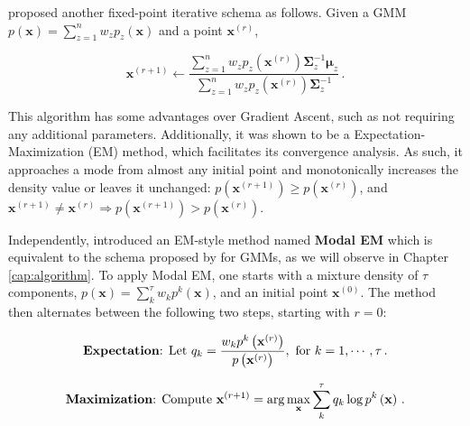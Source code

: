 \citet{Carreira-Perpinan2000} proposed another fixed-point iterative schema as follows. Given a GMM $p(\mathbf{x}) = \sum_{z=1}^n w_z p_z(\mathbf{x})$ and a point $\mathbf{x}^{(r)}$,

\begin{equation}
  \label{eq:mem:gmm}
  \mathbf{x}^{(r+1)} \gets \frac{
  \sum_{z=1}^n w_z p_z\left(\mathbf{x}^{(r)}\right) \boldsymbol{\Sigma}_z^{-1} \boldsymbol{\mu}_z
  }{
  \sum_{z=1}^n w_z p_z\left(\mathbf{x}^{(r)}\right) \boldsymbol{\Sigma}_z^{-1}
  } \, .
\end{equation}

\noindent This algorithm has some advantages over Gradient Ascent, such as not requiring any additional parameters. Additionally, it was shown to be a Expectation-Maximization (EM) method, which facilitates its convergence analysis. As such, it approaches a mode from almost any initial point and monotonically increases the density value or leaves it unchanged: $p(\mathbf{x}^{(r+1)}) \geq p(\mathbf{x}^{(r)})$, and $\mathbf{x}^{(r+1)} \neq \mathbf{x}^{(r)} \Rightarrow p(\mathbf{x}^{(r+1)}) > p(\mathbf{x}^{(r)})$.

Independently, \citet{Li2007} introduced an EM-style method named \textbf{Modal EM} which is equivalent to the schema proposed by \citet{Carreira-Perpinan2000} for GMMs, as we will observe in Chapter \ref{cap:algorithm}. To apply Modal EM, one starts with a mixture density of $\tau$ components, $p(\mathbf{x}) = \sum_k^\tau w_k p^k(\mathbf{x})$, and an initial point $\mathbf{x}^{(0)}$. The method then alternates between the following two steps, starting with $r = 0$:

\begin{equation}
  \label{eq:mem:expectation}
  \text{\textbf{Expectation}: Let }
  q_k = \frac{w_k p^k\left(\mathbf{x}^{(r)}\right)}{p\left(\mathbf{x}^{(r)}\right)},
  \text{ for } k = 1, \cdots, \tau \, .
\end{equation}

\begin{equation}
  \label{eq:mem:maximization}
  \text{\textbf{Maximization}: Compute }
  \mathbf{x}^{(r+1)} = \arg\max_\mathbf{x} \sum_k^\tau q_k \log p^k\left(\mathbf{x}\right) \, .
\end{equation}
